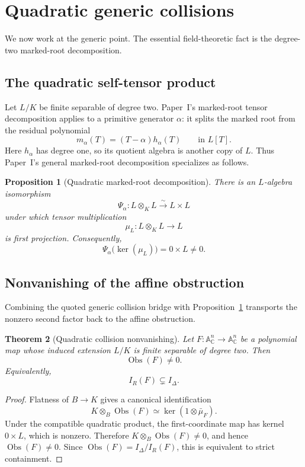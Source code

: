 \documentclass[11pt]{article}
\newtheorem{theorem}{Theorem}[section]
\newtheorem{proposition}[theorem]{Proposition}
\newcommand{\A}{\mathbb A}
\newcommand{\C}{\mathbb C}
\newcommand{\Obs}{\operatorname{Obs}}
\begin{document}
\section{Quadratic generic collisions}
\label{sec:quadratic-collision}

We now work at the generic point.  The essential field-theoretic fact is
the degree-two marked-root decomposition.

\subsection{The quadratic self-tensor product}

Let \(L/K\) be finite separable of degree two.  Paper~I's marked-root
tensor decomposition applies to a primitive generator \(\alpha\): it
splits the marked root from the residual polynomial
\[
  m_\alpha(T)=(T-\alpha)h_\alpha(T)
  \qquad\text{in }L[T].
\]
Here \(h_\alpha\) has degree one, so its quotient algebra is another copy
of \(L\).  Thus Paper~I's general marked-root decomposition
\cite[Theorem~2.6]{VanDerVlugt2026CubicCollision} specializes as follows.

\begin{proposition}[Quadratic marked-root decomposition]
\label{prop:quadratic-tensor-product}
There is an \(L\)-algebra isomorphism
\[
  \Psi_\alpha\colon
  L\otimes_KL\xrightarrow{\ \sim\ }L\times L
\]
under which tensor multiplication
\[
  \mu_L\colon L\otimes_KL\longrightarrow L
\]
is first projection.  Consequently,
\[
  \Psi_\alpha\bigl(\ker(\mu_L)\bigr)=0\times L\neq0.
\]
\end{proposition}

\subsection{Nonvanishing of the affine obstruction}

Combining the quoted generic collision bridge with
Proposition~\ref{prop:quadratic-tensor-product} transports the nonzero
second factor back to the affine obstruction.

\begin{theorem}[Quadratic collision nonvanishing]
\label{thm:quadratic-obstruction-nonzero}
Let \(F\colon\A^n_{\C}\to\A^n_{\C}\) be a polynomial map whose induced
extension \(L/K\) is finite separable of degree two.  Then
\[
  \Obs(F)\neq0.
\]
Equivalently,
\[
  I_R(F)\subsetneq I_\Delta.
\]
\end{theorem}

\begin{proof}
Flatness of \(B\to K\) gives a canonical identification
\[
  K\otimes_B\Obs(F)
  \simeq
  \ker(1\otimes\bar\mu_F).
\]
Under the compatible quadratic product, the first-coordinate map has
kernel \(0\times L\), which is nonzero.  Therefore \(K\otimes_B\Obs(F)\neq0\), and hence
\(\Obs(F)\neq0\).  Since \(\Obs(F)=I_\Delta/I_R(F)\), this is equivalent
to strict containment.
\end{proof}
\end{document}
